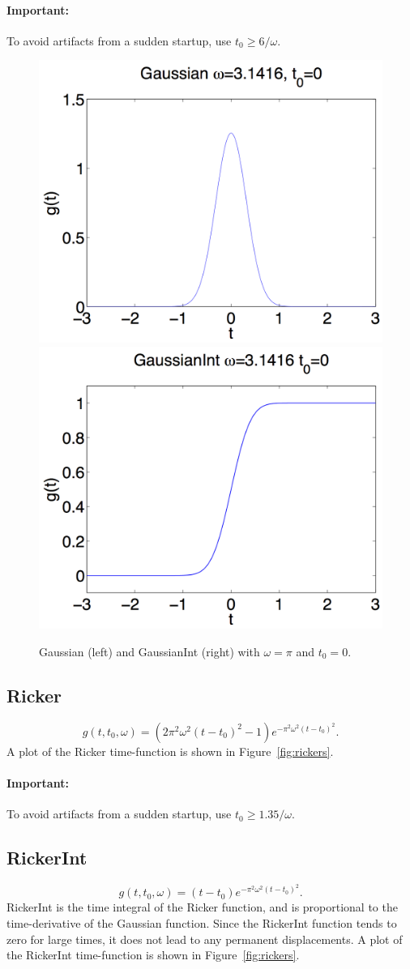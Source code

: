 \documentclass[11pt]{report}
\begin{document}
\paragraph{Important:} To avoid artifacts from a sudden startup, use
$t_0 \geq 6/\omega$.
\begin{figure}
\begin{centering}
  \includegraphics[width=0.4\linewidth]{f1-gaussian.png}
  \includegraphics[width=0.4\linewidth]{f2-gaussianint.png}
  \caption{Gaussian (left) and GaussianInt (right) with $\omega=\pi$ and $t_0=0$.}
  \label{fig:gaussians}
\end{centering}
\end{figure}  
%
\subsection{Ricker} \label{ricker}
  \[
  g(t,t_0,\omega) = \left(2 \pi^2 \omega^2 (t - t_0)^2 - 1\right) e^{- \pi^2 \omega^2 (t - t_0)^2}.
  \]
A plot of the Ricker time-function is shown in Figure~\ref{fig:rickers}.

\paragraph{Important:} To avoid artifacts from a sudden startup, use
$t_0 \geq 1.35/\omega$.

\subsection{RickerInt}\label{rickerint}
  \[
  g(t,t_0,\omega) = (t - t_0) e^{- \pi^2 \omega^2 (t - t_0)^2}.
  \]
RickerInt is the time integral of the Ricker function, and is proportional to the time-derivative of
the Gaussian function. Since the RickerInt function tends to zero for large times, it does not lead
to any permanent displacements. A plot of the RickerInt time-function is shown in
Figure~\ref{fig:rickers}.
\end{document}

